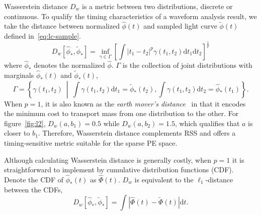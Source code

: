 Wasserstein distance $D_w$ is a metric between two distributions, discrete or continuous. To qualify the timing characteristics of a waveform analysis result, we take the distance between normalized $\hat{\phi}(t)$ and sampled light curve $\tilde{\phi}(t)$ defined in~\eqref{eq:lc-sample}.
\begin{equation}
  D_w\left[\hat{\phi}_*, \tilde{\phi}_*\right] = \inf_{\gamma \in \Gamma} \left[\int \left\vert t_1 - t_2 \right\vert^p \gamma(t_1, t_2)\mathrm{d}t_1\mathrm{d}t_2\right]^{\frac{1}{p}}
\end{equation}
where $\hat{\phi}_*$ denotes the normalized $\hat{\phi}$. $\Gamma$ is the collection of joint distributions with marginals $\hat{\phi}_*(t)$ and $\tilde{\phi}_*(t)$,
\begin{equation*}
  \label{eq:joint}
  \Gamma = \left\{\gamma(t_1, t_2) ~\middle\vert~ \int\gamma(t_1,t_2)\mathrm{d}t_1 = \tilde{\phi}_*(t_2) , \int\gamma(t_1,t_2)\mathrm{d}t_2 = \hat{\phi}_*(t_1)  \right\}.
\end{equation*}
When $p=1$, it is also known as the \textit{earth mover's distance}~\cite{levina_earth_2001} in that it encodes the minimum cost to transport mass from one distribution to the other.
For figure~\ref{fig:l2}, $D_w(a, b_1) = 0.5$ while $D_w(a, b_2) = 1.5$, which qualifies that $a$ is closer to $b_1$.  Therefore, Wasserstein distance complements RSS and offers a timing-sensitive metric suitable for the sparse PE space.

Although calculating Wasserstein distance is generally costly, when $p=1$ it is straightforward to implement by cumulative distribution functions (CDF).  Denote the CDF of $\hat{\phi}_*(t)$ as $\hat\Phi(t)$.  $D_w$ is equivalent to the $\ell_1$-distance between the CDFs,
\begin{equation}
    D_w\left[\hat{\phi}_*, \tilde{\phi}_*\right] = \int\left|\hat{\Phi}(t) - \tilde{\Phi}(t)\right| \mathrm{d}t.
    \label{eq:numerical}
\end{equation}
